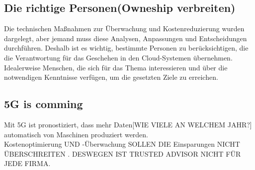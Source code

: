 \subsection{Die richtige Personen(Owneship verbreiten)}
Die technischen Maßnahmen zur Überwachung und Kostenreduzierung wurden dargelegt, aber jemand muss diese Analysen, Anpassungen und Entscheidungen durchführen. 
Deshalb ist es wichtig, bestimmte Personen zu berücksichtigen, die die Verantwortung für das Geschehen in den Cloud-Systemen übernehmen. Idealerweise Menschen, die sich für das Thema interessieren und über die notwendigen Kenntnisse verfügen, um die gesetzten Ziele zu erreichen. 
\\
\subsection{5G is comming}
Mit 5G ist pronostiziert, dass mehr Daten[WIE VIELE AN WELCHEM JAHR?] automatisch von Maschinen produziert werden.
\\
Kostenoptimierung UND -Überwachung SOLLEN DIE Einsparungen NICHT ÜBERSCHREITEN . DESWEGEN IST TRUSTED ADVISOR NICHT FÜR JEDE FIRMA.
\begin{comment}
Von Buch "Gestaltung"
  Schluss (Fazit)
Den Abschluss der Arbeit bildet die Zusammenfassung der wesentlichen
Ergebnisse, die folgende drei Punkte beinhaltet:
Beantwortung der Forschungsfrage, die Sie in der Einleitung
aufgeworfen haben.
Sinnstiftung der Arbeit: Für welchen Zweck sollen die Ergebnisse
verwendet werden?
Gegebenenfalls auch persönliche Bemerkungen und Bewertungen oder
ein kurzer Ausblick.
\end{tcolorbox}

\end{comment}

